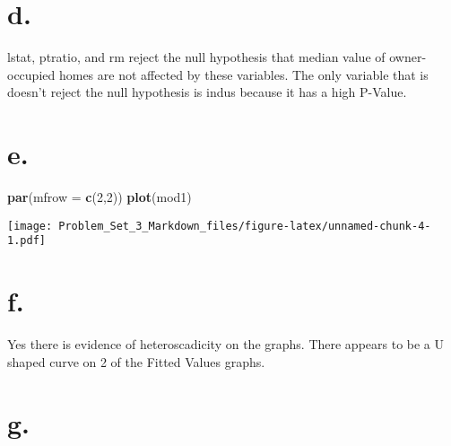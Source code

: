 \documentclass[]{article}
\newenvironment{Shaded}{\begin{snugshade}}{\end{snugshade}}
\newcommand{\KeywordTok}[1]{\textcolor[rgb]{0.13,0.29,0.53}{\textbf{#1}}}
\newcommand{\DataTypeTok}[1]{\textcolor[rgb]{0.13,0.29,0.53}{#1}}
\newcommand{\DecValTok}[1]{\textcolor[rgb]{0.00,0.00,0.81}{#1}}
\newcommand{\StringTok}[1]{\textcolor[rgb]{0.31,0.60,0.02}{#1}}
\newcommand{\OperatorTok}[1]{\textcolor[rgb]{0.81,0.36,0.00}{\textbf{#1}}}
\newcommand{\NormalTok}[1]{#1}
\begin{document}
\section{d.}\label{d.}

lstat, ptratio, and rm reject the null hypothesis that median value of
owner-occupied homes are not affected by these variables. The only
variable that is doesn't reject the null hypothesis is indus because it
has a high P-Value.

\section{e.}\label{e.}

\begin{Shaded}
\begin{Highlighting}[]
\KeywordTok{par}\NormalTok{(}\DataTypeTok{mfrow =} \KeywordTok{c}\NormalTok{(}\DecValTok{2}\NormalTok{,}\DecValTok{2}\NormalTok{))}
\KeywordTok{plot}\NormalTok{(mod1)}
\end{Highlighting}
\end{Shaded}

\texttt{[image: Problem\_Set\_3\_Markdown\_files/figure-latex/unnamed-chunk-4-1.pdf]}

\section{f.}\label{f.}

Yes there is evidence of heteroscadicity on the graphs. There appears to
be a U shaped curve on 2 of the Fitted Values graphs.

\section{g.}\label{g.}

\begin{Shaded}
\end{Shaded}
\end{document}
